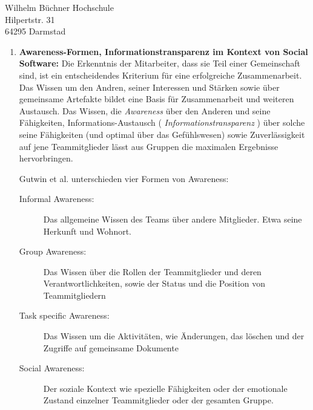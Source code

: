 \documentclass[
    version=last,           %
    DIV=13,                 %
    BCOR=0mm,               %
    paper=a4,               %
    fontsize=12pt,          %
    firsthead=on,           %
    firstfoot=on,           %
    pagenumber=on,i         %
    parskip=half,           %
    enlargefirstpage=,      %
    firsthead=on,           %
    fromrule=afteraddress,  %
    priority=off,           %
    backaddress=true,       %
    refline=dateright,      %
	fromalign=right,	    %
    fromemail=on,i          %
    fromurl=on,             %
    frombank=on,
    fromphone=on,           %
    frommobilephone=on      %
    fromlogo=on,            %
    addrfield=on,           %
    subject=untitled,  %
    foldmarks=off,          %
    numericaldate=off,      %
	pagenumber=right,	        %
	parskip=half,	        %
    headsep=false,          %
    footsepline=true,       %
    foldmarks=off,		    %
	]{scrlttr2}
\begin{document}
\begin{letter} {Wilhelm Büchner Hochschule \\
Hilpertstr. 31\\
64295 Darmstad}
\begin{itemize}
\begin{enumerate}
            \vspace{1cm}

        \item \textbf{Awareness-Formen,  Informationstransparenz im Kontext
                von Social Software:}
            Die Erkenntnis der Mitarbeiter, dass sie Teil einer Gemeinschaft
            sind, ist ein entscheidendes Kriterium für eine erfolgreiche
            Zusammenarbeit. Das Wissen um den Andren, seiner Interessen und
            Stärken sowie über gemeinsame Artefakte bildet eine Basis für
            Zusammenarbeit und weiteren Austausch. Das Wissen, die
            \textit{Awareness} über den Anderen und seine Fähigkeiten,
            Informations-Austausch ( \textit{Informationstransparenz} ) über
            solche seine Fähigkeiten (und optimal über das Gefühlswesen) sowie
            Zuverlässigkeit auf jene Teammitglieder lässt aus Gruppen die
            maximalen Ergebnisse hervorbringen.

            Gutwin et al. unterschieden vier Formen von Awareness:

            \begin{description}
                \item[Informal Awareness: ] Das allgemeine Wissen des Teams über
                    andere Mitglieder. Etwa seine Herkunft und Wohnort.
                \item[Group Awareness: ] Das Wissen über die Rollen der
                    Teammitglieder und deren Verantwortlichkeiten, sowie der
                    Status und die Position von Teammitgliedern
                \item[Task specific Awareness:] Das Wissen um die Aktivitäten,
                    wie Änderungen, das löschen und der Zugriffe auf gemeinsame
                    Dokumente
                \item [Social Awareness:] Der soziale Kontext wie spezielle
                    Fähigkeiten oder der emotionale Zustand einzelner
                    Teammitglieder oder der gesamten Gruppe.
            \end{description}



\end{enumerate}
\end{itemize}
\end{letter}
\end{document}

